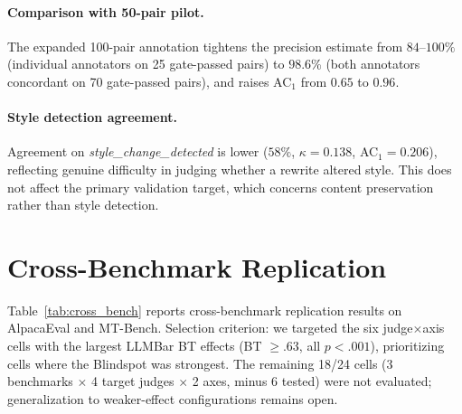 \paragraph{Comparison with 50-pair pilot.}
The expanded 100-pair annotation tightens the precision estimate from $84$--$100\%$ (individual annotators on 25 gate-passed pairs) to $98.6\%$ (both annotators concordant on 70 gate-passed pairs), and raises AC$_1$ from $0.65$ to $0.96$.

\paragraph{Style detection agreement.}
Agreement on \emph{style\_change\_detected} is lower ($58\%$, $\kappa = 0.138$, AC$_1 = 0.206$), reflecting genuine difficulty in judging whether a rewrite altered style.
This does not affect the primary validation target, which concerns content preservation rather than style detection.

\section{Cross-Benchmark Replication}
\label{app:cross_bench}

Table~\ref{tab:cross_bench} reports cross-benchmark replication results on AlpacaEval and MT-Bench.
Selection criterion: we targeted the six judge$\times$axis cells with the largest LLMBar BT effects (BT $\geq .63$, all $p < .001$), prioritizing cells where the Blindspot was strongest.
The remaining 18/24 cells (3 benchmarks $\times$ 4 target judges $\times$ 2 axes, minus 6 tested) were not evaluated; generalization to weaker-effect configurations remains open.

\begin{table}[h]
\centering
\small
\caption{Cross-benchmark replication on AlpacaEval (AEval) and MT-Bench (MTB). $\ddagger$: both BT and Likert significant; $\dagger$: Blindspot (BT significant, Likert not).}
\label{tab:cross_bench}
\end{table}

